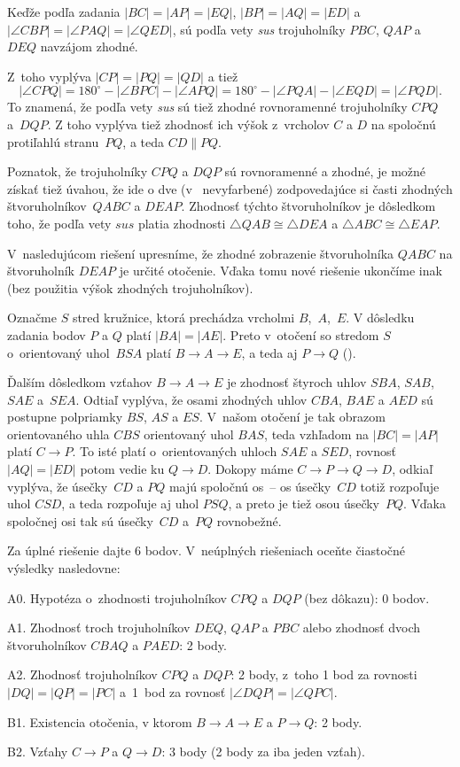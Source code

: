 {%
Keďže podľa zadania $|BC|=|AP|=|EQ|$, $|BP|=|AQ|=|ED|$ a $|\angle CBP| = |\angle PAQ| = |\angle QED|$, sú podľa vety \emph{sus}
trojuholníky $PBC$, $QAP$ a $DEQ$ navzájom zhodné.
%

Z~toho vyplýva $|CP| =|PQ|=|QD|$ a tiež
$$
|\angle CPQ| =180^\circ -|\angle BPC|-|\angle APQ|=180^\circ - |\angle PQA| - |\angle EQD| = |\angle PQD|.
$$
To znamená, že podľa vety \emph{sus} sú tiež zhodné rovnoramenné
trojuholníky $CPQ$ a~$DQP$. Z toho vyplýva tiež zhodnosť ich výšok
z~vrcholov $C$ a $D$ na spoločnú protiľahlú stranu~$PQ$, a teda $CD\parallel PQ$.

\poznamka
Poznatok, že trojuholníky $CPQ$ a $DQP$ sú rovnoramenné a zhodné, je možné
získať tiež úvahou, že ide o dve (v~\obr{} nevyfarbené)
zodpovedajúce si časti zhodných štvoruholníkov~$QABC$ a $DEAP$.
Zhodnosť týchto štvoruholníkov je
dôsledkom toho, že podľa vety $sus$ platia zhodnosti
$\triangle QAB\cong \triangle DEA$ a
$\triangle ABC\cong \triangle EAP$.

V~nasledujúcom riešení upresníme, že zhodné zobrazenie
štvoruholníka $QABC$ na štvoruholník $DEAP$ je určité otočenie. Vďaka
tomu nové riešenie ukončíme inak (bez použitia výšok zhodných
trojuholníkov).


\ineriesenie
Označme $S$ stred kružnice, ktorá prechádza vrcholmi $B$,~$A$,~$E$.
V dôsledku zadania bodov $P$ a $Q$ platí $|BA|=|AE|$.
Preto v~otočení so stredom $S$ o~orientovaný uhol~$BSA$
platí $B\to A\to E$, a teda aj $P\to Q$ (\obr).
%

Ďalším dôsledkom vzťahov $B\to A\to E$ je zhodnosť štyroch uhlov
$SBA$, $SAB$, $SAE$ a~$SEA$. Odtiaľ vyplýva, že osami zhodných uhlov
$CBA$, $BAE$ a $AED$ sú postupne polpriamky $BS$, $AS$ a $ES$.
V~našom otočení je tak obrazom orientovaného uhla $CBS$
orientovaný uhol $BAS$, teda vzhľadom na $|BC|=|AP|$ platí $C\to P$.
To isté platí o~orientovaných uhloch $SAE$ a $SED$, rovnosť
$|AQ|=|ED|$ potom vedie ku $Q\to D$. Dokopy máme $C\to P\to Q\to D$,
odkiaľ vyplýva, že úsečky~$CD$ a $PQ$ majú spoločnú os~--
os úsečky~$CD$ totiž rozpoľuje uhol $CSD$, a teda
rozpoľuje aj uhol $PSQ$, a preto je tiež osou úsečky~$PQ$. Vďaka spoločnej
osi tak sú úsečky~$CD$ a~$PQ$ rovnobežné.


\schemaABC
Za úplné riešenie dajte 6 bodov. V~neúplných riešeniach oceňte
čiastočné výsledky nasledovne:
\item{A0.} Hypotéza o~zhodnosti trojuholníkov $CPQ$ a $DQP$ (bez dôkazu): 0 bodov.
\item{A1.} Zhodnosť troch trojuholníkov $DEQ$, $QAP$ a $PBC$ alebo zhodnosť dvoch
štvoruholníkov $CBAQ$ a $PAED$: 2 body.
\item{A2.} Zhodnosť trojuholníkov $CPQ$ a $DQP$: 2 body, z~toho 1 bod za rovnosti
$|DQ|=|QP|=|PC|$ a~1~bod za rovnosť $|\angle DQP| = |\angle QPC|$.
\item{B1.} Existencia otočenia, v ktorom $B \to A\to E$ a $P\to Q$: 2 body.
\item{B2.} Vzťahy $C\to P$ a $Q\to D$: 3 body (2 body za iba jeden vzťah).

}
